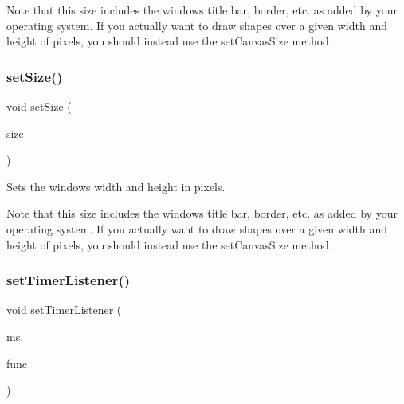 Note that this size includes the window\textquotesingle{}s title bar, border, etc. as added by your operating system. If you actually want to draw shapes over a given width and height of pixels, you should instead use the set\+Canvas\+Size method. \mbox{\label{classGWindow_ae2b628228f192c2702c4ce941b2af68f}} 
\subsubsection{\texorpdfstring{set\+Size()}{setSize()}\hspace{0.1cm}{\footnotesize\ttfamily [2/2]}}
{\footnotesize\ttfamily void set\+Size (\begin{DoxyParamCaption}\item[{const \mbox{\hyperlink{structGDimension}{G\+Dimension}} \&}]{size }\end{DoxyParamCaption})\hspace{0.3cm}{\ttfamily [virtual]}}



Sets the window\textquotesingle{}s width and height in pixels. 

Note that this size includes the window\textquotesingle{}s title bar, border, etc. as added by your operating system. If you actually want to draw shapes over a given width and height of pixels, you should instead use the set\+Canvas\+Size method. \mbox{\label{classGWindow_ae0d5df4c2ed47156cbba7da55362e4e1}} 
\subsubsection{\texorpdfstring{set\+Timer\+Listener()}{setTimerListener()}\hspace{0.1cm}{\footnotesize\ttfamily [1/2]}}
{\footnotesize\ttfamily void set\+Timer\+Listener (\begin{DoxyParamCaption}\item[{double}]{ms,  }\item[{G\+Event\+Listener}]{func }\end{DoxyParamCaption})\hspace{0.3cm}{\ttfamily [virtual]}}



